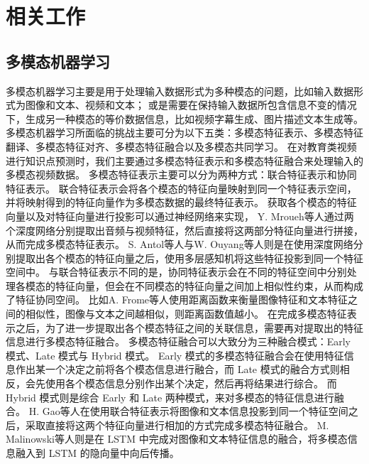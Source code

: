 \chapter{相关工作}

\section{多模态机器学习}
    多模态机器学习主要是用于处理输入数据形式为多种模态的问题，比如输入数据形式为图像和文本\cite{Frome2013DeViSEAD}、视频和文本\cite{Xu2015JointlyMD, Bojanowski2015WeaklySupervisedAO}；
    或是需要在保持输入数据所包含信息不变的情况下，生成另一种模态的等价数据信息，比如视频字幕生成\cite{Austin2017TranslatingVT}、图片描述文本生成\cite{Mao2015DeepCW}等。
    多模态机器学习所面临的挑战主要可分为以下五类\cite{Baltruaitis2019MultimodalML}：多模态特征表示、多模态特征翻译、多模态特征对齐、多模态特征融合以及多模态共同学习。
    在对教育类视频进行知识点预测时，我们主要通过多模态特征表示和多模态特征融合来处理输入的多模态视频数据。
    多模态特征表示主要可以分为两种方式：联合特征表示和协同特征表示。
    联合特征表示会将各个模态的特征向量映射到同一个特征表示空间，并将映射得到的特征向量作为多模态数据的最终特征表示。
    获取各个模态的特征向量以及对特征向量进行投影可以通过神经网络来实现，
    Y. Mroueh等人\cite{Mroueh2015DeepML}通过两个深度网络分别提取出音频与视频特征，然后直接将这两部分特征向量进行拼接，从而完成多模态特征表示。
    S. Antol等人\cite{Agrawal2015VQAVQ}与W. Ouyang等人\cite{Ouyang2014MultisourceDL}则是在使用深度网络分别提取出各个模态的特征向量之后，使用多层感知机将这些特征投影到同一个特征空间中。
    与联合特征表示不同的是，协同特征表示会在不同的特征空间中分别处理各模态的特征向量，但会在不同模态的特征向量之间加上相似性约束，从而构成了特征协同空间。
    比如A. Frome等人\cite{Frome2013DeViSEAD}使用距离函数来衡量图像特征和文本特征之间的相似性，图像与文本之间越相似，则距离函数值越小。
    在完成多模态特征表示之后，为了进一步提取出各个模态特征之间的关联信息，需要再对提取出的特征信息进行多模态特征融合。
    多模态特征融合可以大致分为三种融合模式：Early 模式、Late 模式与 Hybrid 模式。
    Early 模式的多模态特征融合会在使用特征信息作出某一个决定之前将各个模态信息进行融合，而 Late 模式的融合方式则相反，会先使用各个模态信息分别作出某个决定，然后再将结果进行综合。
    而 Hybrid 模式则是综合 Early 和 Late 两种模式，来对多模态的特征信息进行融合。
    H. Gao等人\cite{Gao2015AreYT}在使用联合特征表示将图像和文本信息投影到同一个特征空间之后，采取直接将这两个特征向量进行相加的方式完成多模态特征融合。
    M. Malinowski等人\cite{Malinowski2015AskYN}则是在 LSTM 中完成对图像和文本特征信息的融合，将多模态信息融入到 LSTM 的隐向量中向后传播。


